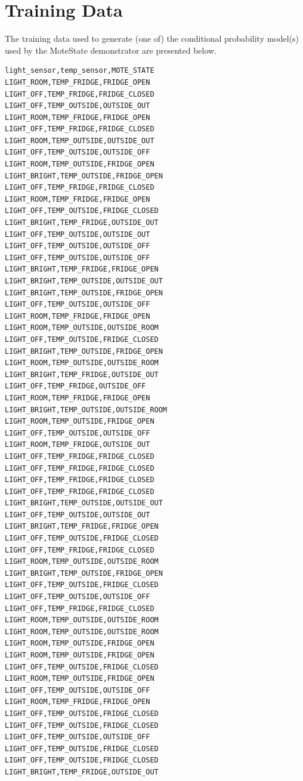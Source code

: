 \documentclass{sig-alternate-10pt}
\newenvironment{mylisting}
{\begin{list}{}{\setlength{\leftmargin}{1em}}\item\scriptsize\bfseries}
{\end{list}}
\begin{document}





\appendix

\section{Training Data} \label{sec:appendixA}

The training data used to generate (one of) the conditional probability model(s) used by the MoteState demonstrator are presented below.
\begin{center}
\begin{mylisting}
\begin{verbatim}
light_sensor,temp_sensor,MOTE_STATE
LIGHT_ROOM,TEMP_FRIDGE,FRIDGE_OPEN
LIGHT_OFF,TEMP_FRIDGE,FRIDGE_CLOSED
LIGHT_OFF,TEMP_OUTSIDE,OUTSIDE_OUT
LIGHT_ROOM,TEMP_FRIDGE,FRIDGE_OPEN
LIGHT_OFF,TEMP_FRIDGE,FRIDGE_CLOSED
LIGHT_ROOM,TEMP_OUTSIDE,OUTSIDE_OUT
LIGHT_OFF,TEMP_OUTSIDE,OUTSIDE_OFF
LIGHT_ROOM,TEMP_OUTSIDE,FRIDGE_OPEN
LIGHT_BRIGHT,TEMP_OUTSIDE,FRIDGE_OPEN
LIGHT_OFF,TEMP_FRIDGE,FRIDGE_CLOSED
LIGHT_ROOM,TEMP_FRIDGE,FRIDGE_OPEN
LIGHT_OFF,TEMP_OUTSIDE,FRIDGE_CLOSED
LIGHT_BRIGHT,TEMP_FRIDGE,OUTSIDE_OUT
LIGHT_OFF,TEMP_OUTSIDE,OUTSIDE_OUT
LIGHT_OFF,TEMP_OUTSIDE,OUTSIDE_OFF
LIGHT_OFF,TEMP_OUTSIDE,OUTSIDE_OFF
LIGHT_BRIGHT,TEMP_FRIDGE,FRIDGE_OPEN
LIGHT_BRIGHT,TEMP_OUTSIDE,OUTSIDE_OUT
LIGHT_BRIGHT,TEMP_OUTSIDE,FRIDGE_OPEN
LIGHT_OFF,TEMP_OUTSIDE,OUTSIDE_OFF
LIGHT_ROOM,TEMP_FRIDGE,FRIDGE_OPEN
LIGHT_ROOM,TEMP_OUTSIDE,OUTSIDE_ROOM
LIGHT_OFF,TEMP_OUTSIDE,FRIDGE_CLOSED
LIGHT_BRIGHT,TEMP_OUTSIDE,FRIDGE_OPEN
LIGHT_ROOM,TEMP_OUTSIDE,OUTSIDE_ROOM
LIGHT_BRIGHT,TEMP_FRIDGE,OUTSIDE_OUT
LIGHT_OFF,TEMP_FRIDGE,OUTSIDE_OFF
LIGHT_ROOM,TEMP_FRIDGE,FRIDGE_OPEN
LIGHT_BRIGHT,TEMP_OUTSIDE,OUTSIDE_ROOM
LIGHT_ROOM,TEMP_OUTSIDE,FRIDGE_OPEN
LIGHT_OFF,TEMP_OUTSIDE,OUTSIDE_OFF
LIGHT_ROOM,TEMP_FRIDGE,OUTSIDE_OUT
LIGHT_OFF,TEMP_FRIDGE,FRIDGE_CLOSED
LIGHT_OFF,TEMP_FRIDGE,FRIDGE_CLOSED
LIGHT_OFF,TEMP_FRIDGE,FRIDGE_CLOSED
LIGHT_OFF,TEMP_FRIDGE,FRIDGE_CLOSED
LIGHT_BRIGHT,TEMP_OUTSIDE,OUTSIDE_OUT
LIGHT_OFF,TEMP_OUTSIDE,OUTSIDE_OUT
LIGHT_BRIGHT,TEMP_FRIDGE,FRIDGE_OPEN
LIGHT_OFF,TEMP_OUTSIDE,FRIDGE_CLOSED
LIGHT_OFF,TEMP_FRIDGE,FRIDGE_CLOSED
LIGHT_ROOM,TEMP_OUTSIDE,OUTSIDE_ROOM
LIGHT_BRIGHT,TEMP_OUTSIDE,FRIDGE_OPEN
LIGHT_OFF,TEMP_OUTSIDE,FRIDGE_CLOSED
LIGHT_OFF,TEMP_OUTSIDE,OUTSIDE_OFF
LIGHT_OFF,TEMP_FRIDGE,FRIDGE_CLOSED
LIGHT_ROOM,TEMP_OUTSIDE,OUTSIDE_ROOM
LIGHT_ROOM,TEMP_OUTSIDE,OUTSIDE_ROOM
LIGHT_ROOM,TEMP_OUTSIDE,FRIDGE_OPEN
LIGHT_ROOM,TEMP_OUTSIDE,FRIDGE_OPEN
LIGHT_OFF,TEMP_OUTSIDE,FRIDGE_CLOSED
LIGHT_ROOM,TEMP_OUTSIDE,FRIDGE_OPEN
LIGHT_OFF,TEMP_OUTSIDE,OUTSIDE_OFF
LIGHT_ROOM,TEMP_FRIDGE,FRIDGE_OPEN
LIGHT_OFF,TEMP_OUTSIDE,FRIDGE_CLOSED
LIGHT_OFF,TEMP_OUTSIDE,FRIDGE_CLOSED
LIGHT_OFF,TEMP_OUTSIDE,OUTSIDE_OFF
LIGHT_OFF,TEMP_OUTSIDE,FRIDGE_CLOSED
LIGHT_OFF,TEMP_OUTSIDE,FRIDGE_CLOSED
LIGHT_BRIGHT,TEMP_FRIDGE,OUTSIDE_OUT
\end{verbatim}
\end{mylisting}
\end{center}
   
\end{document}
